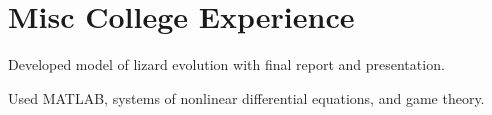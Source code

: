 \documentclass[]{deedy-resume-openfont}
\begin{document}
\begin{minipage}[t]{0.55\textwidth}

\section{Misc College Experience}
\vspace{\topsep}
\begin{tightemize}
\item Developed model of lizard evolution with final report
and presentation.
\item Used MATLAB, systems of nonlinear differential equations, and game theory.
\end{tightemize}
\sectionsep





%
%



\end{minipage}
\end{document}

